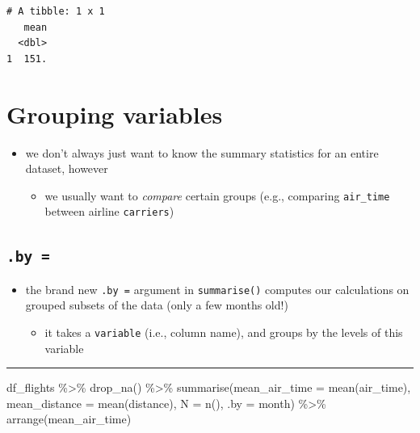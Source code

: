 \documentclass[
  letterpaper,
  DIV=11]{scrartcl}
\newenvironment{Shaded}{\begin{snugshade}}{\end{snugshade}}
\newcommand{\AttributeTok}[1]{\textcolor[rgb]{0.40,0.45,0.13}{#1}}
\newcommand{\FunctionTok}[1]{\textcolor[rgb]{0.28,0.35,0.67}{#1}}
\newcommand{\NormalTok}[1]{\textcolor[rgb]{0.00,0.23,0.31}{#1}}
\newcommand{\SpecialCharTok}[1]{\textcolor[rgb]{0.37,0.37,0.37}{#1}}
\providecommand{\tightlist}{%
  \setlength{\itemsep}{0pt}\setlength{\parskip}{0pt}}\usepackage{longtable,booktabs,array}
\begin{document}
\begin{verbatim}
# A tibble: 1 x 1
   mean
  <dbl>
1  151.
\end{verbatim}

\hypertarget{grouping-variables}{%
\section{Grouping variables}\label{grouping-variables}}

\begin{itemize}
\tightlist
\item
  we don't always just want to know the summary statistics for an entire
  dataset, however

  \begin{itemize}
  \tightlist
  \item
    we usually want to \emph{compare} certain groups (e.g., comparing
    \texttt{air\_time} between airline \texttt{carriers})
  \end{itemize}
\end{itemize}

\hypertarget{by}{%
\subsection{\texorpdfstring{\texttt{.by\ =}}{.by =}}\label{by}}

\begin{itemize}
\tightlist
\item
  the brand new \texttt{.by\ =} argument in \texttt{summarise()}
  computes our calculations on grouped subsets of the data (only a few
  months old!)

  \begin{itemize}
  \tightlist
  \item
    it takes a \texttt{variable} (i.e., column name), and groups by the
    levels of this variable
  \end{itemize}
\end{itemize}

\begin{center}\rule{0.5\linewidth}{0.5pt}\end{center}

\begin{Shaded}
\begin{Highlighting}[]
\NormalTok{df\_flights }\SpecialCharTok{\%\textgreater{}\%} 
  \FunctionTok{drop\_na}\NormalTok{() }\SpecialCharTok{\%\textgreater{}\%} 
  \FunctionTok{summarise}\NormalTok{(}\AttributeTok{mean\_air\_time =} \FunctionTok{mean}\NormalTok{(air\_time),}
            \AttributeTok{mean\_distance =} \FunctionTok{mean}\NormalTok{(distance),}
            \AttributeTok{N =} \FunctionTok{n}\NormalTok{(),}
            \AttributeTok{.by =}\NormalTok{ month) }\SpecialCharTok{\%\textgreater{}\%} 
  \FunctionTok{arrange}\NormalTok{(mean\_air\_time)}
\end{Highlighting}
\end{Shaded}
\end{document}

